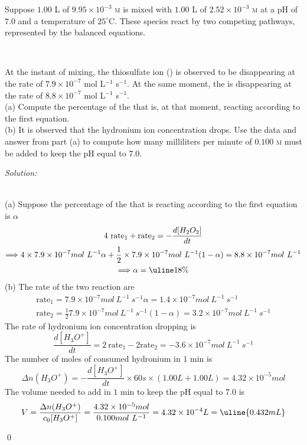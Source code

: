 \documentclass[12pt]{article}
\newenvironment{problem}[2][Problem]{\begin{trivlist}
\item[\hskip \labelsep {\bfseries #1}\hskip \labelsep {\bfseries #2.}]}{\end{trivlist}}
\newenvironment{sol}
    {\emph{Solution:}
    }
    {
    \qed
    }
\begin{document}
\begin{problem}{18.50}
Suppose $1.00$ L of $9.95\times10^{-3}$ \textsc{m}  is mixed with $1.00$ L of $2.52\times10^{-3}$ \textsc{m}  at a pH of $7.0$ and a temperature of $25^{\circ}$C. These species react by two competing pathways, represented by the balanced equations.
\begin{center}
\\
\end{center}
At the instant of mixing, the thiosulfate ion () is observed to be disappearing at the rate of $7.9\times10^{-7}$ mol L$^{-1}$ s$^{-1}$. At the same moment, the  is disappearing at the rate of $8.8\times10^{-7}$ mol L$^{-1}$ s$^{-1}$.\\
(a) Compute the percentage of the  that is, at that moment, reacting according to the first equation.\\
(b) It is observed that the hydronium ion concentration drops. Use the data and answer from part (a) to compute how many milliliters per minute of $0.100$ \textsc{m}  must be added to keep the pH equal to $7.0$.
\end{problem}
\begin{sol}
\\(a) Suppose the percentage of the  that is reacting according to the first equation is $\alpha$
\begin{gather*}
4~\text{rate}_1+\text{rate}_2=-\frac{d[H_2O_2]}{dt}\\
\Longrightarrow4\times7.9\times10^{-7}mol~L^{-1}\alpha+\frac{1}{2}\times7.9\times10^{-7}mol~L^{-1}(1-\alpha)=8.8\times10^{-7}mol~L^{-1}\\
\Longrightarrow\alpha=\uline{18\%}
\end{gather*}
(b) The rate of the two reaction are
\begin{gather*}
\text{rate}_1=7.9\times10^{-7}mol~L^{-1}~s^{-1}\alpha=1.4\times10^{-7}mol~L^{-1}~s^{-1}\\
\text{rate}_2=\frac{1}{2}7.9\times10^{-7}mol~L^{-1}~s^{-1}(1-\alpha)=3.2\times10^{-7}mol~L^{-1}~s^{-1}
\end{gather*}
The rate of hydronium ion concentration dropping is
\[
\frac{d[H_3O^+]}{dt}=2~\text{rate}_1-2\text{rate}_2=-3.6\times10^{-7}mol~L^{-1}~s^{-1}
\]
The number of moles of consumed hydronium in $1$ min is
\[
\Delta n(H_3O^+)=-\frac{d[H_3O^+]}{dt}\times60s\times(1.00L+1.00L)=4.32\times10^{-5}mol
\]
The volume needed to add in $1$ min to keep the pH equal to $7.0$ is
\[
V=\frac{\Delta n(H_3O^+)}{c_0[H_3O^+]}=\frac{4.32\times10^{-5}mol}{0.100mol~L^{-1}}=4.32\times10^{-4}L=\uline{0.432mL}
\]
\end{sol}
\end{document}
